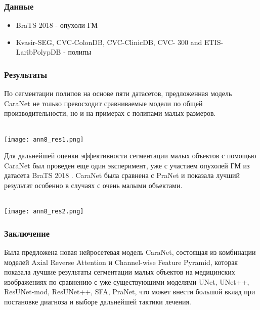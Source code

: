 \subsubsection*{Данные}
\begin{itemize}
    \item BraTS 2018 - опухоли ГМ
    \item Kvasir-SEG, CVC-ColonDB, CVC-ClinicDB, CVC-
    300 and ETIS-LaribPolypDB - полипы
\end{itemize}
 
\subsubsection*{Результаты}
По сегментации полипов на основе пяти датасетов, предложенная модель CaraNet не только 
превосходит сравниваемые модели по общей производительности, но и на примерах с полипами 
малых размеров. \\
\\
\begin{minipage}{1.0\linewidth}
    \begin{center}
        \texttt{[image: ann8\_res1.png]}
    \end{center}
\end{minipage}

Для дальнейшей оценки эффективности сегментации малых объектов с помощью CaraNet был 
проведен еще один эксперимент, уже с участием опухолей ГМ из датасета BraTS 2018 \cite{BraTS}. CaraNet 
была сравнена с PraNet \cite{PraNet} и показала лучший результат особенно в случаях с очень малыми объектами. \\
\\
\begin{minipage}{1.0\linewidth}
    \begin{center}
        \texttt{[image: ann8\_res2.png]} \\
    \end{center}
    
\end{minipage}



\subsubsection*{Заключение}
Была предложена новая нейросетевая модель CaraNet, состоящая из комбинации моделей 
Axial Reverse Attention и Channel-wise Feature Pyramid, которая показала 
лучшие результаты сегментации малых объектов на медицинских изображениях по сравнению с уже существующими моделями 
UNet, UNet++, ResUNet-mod, ResUNet++, SFA, PraNet, что может внести большой вклад 
при постановке диагноза и выборе дальнейшей тактики лечения.